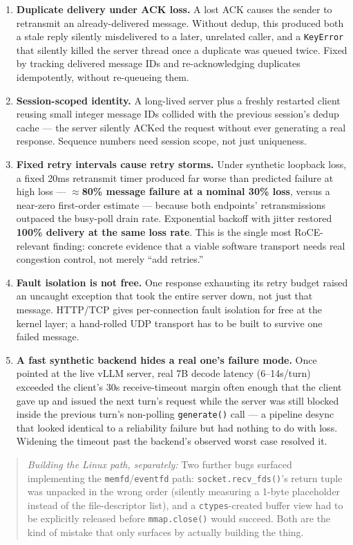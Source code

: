 \documentclass[11pt]{article}
\begin{document}
\begin{enumerate}[leftmargin=22pt]
\item \textbf{Duplicate delivery under ACK loss.} A lost ACK causes the sender to retransmit an already-delivered message. Without dedup, this produced both a stale reply silently misdelivered to a later, unrelated caller, and a \texttt{KeyError} that silently killed the server thread once a duplicate was queued twice. Fixed by tracking delivered message IDs and re-acknowledging duplicates idempotently, without re-queueing them.
\item \textbf{Session-scoped identity.} A long-lived server plus a freshly restarted client reusing small integer message IDs collided with the previous session's dedup cache --- the server silently ACKed the request without ever generating a real response. Sequence numbers need session scope, not just uniqueness.
\item \textbf{Fixed retry intervals cause retry storms.} Under synthetic loopback loss, a fixed 20ms retransmit timer produced far worse than predicted failure at high loss --- \textbf{$\approx$80\% message failure at a nominal 30\% loss}, versus a near-zero first-order estimate --- because both endpoints' retransmissions outpaced the busy-poll drain rate. Exponential backoff with jitter restored \textbf{100\% delivery at the same loss rate}. This is the single most RoCE-relevant finding: concrete evidence that a viable software transport needs real congestion control, not merely ``add retries.''
\item \textbf{Fault isolation is not free.} One response exhausting its retry budget raised an uncaught exception that took the entire server down, not just that message. HTTP/TCP gives per-connection fault isolation for free at the kernel layer; a hand-rolled UDP transport has to be built to survive one failed message.
\item \textbf{A fast synthetic backend hides a real one's failure mode.} Once pointed at the live vLLM server, real 7B decode latency (6--14s/turn) exceeded the client's 30s receive-timeout margin often enough that the client gave up and issued the next turn's request while the server was still blocked inside the previous turn's non-polling \texttt{generate()} call --- a pipeline desync that looked identical to a reliability failure but had nothing to do with loss. Widening the timeout past the backend's observed worst case resolved it.
\end{enumerate}

\begin{quotation}
\noindent\textit{Building the Linux path, separately:} Two further bugs surfaced implementing the \texttt{memfd}/\texttt{eventfd} path: \texttt{socket.recv\_fds()}'s return tuple was unpacked in the wrong order (silently measuring a 1-byte placeholder instead of the file-descriptor list), and a \texttt{ctypes}-created buffer view had to be explicitly released before \texttt{mmap.close()} would succeed. Both are the kind of mistake that only surfaces by actually building the thing.
\end{quotation}
\end{document}
